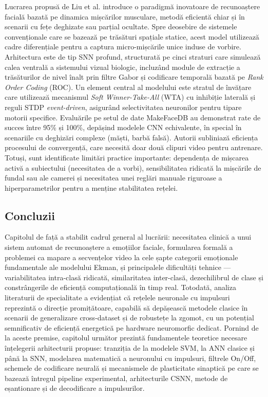 Lucrarea propusă de Liu et al. \cite{liu2020} introduce o paradigmă inovatoare de re\-cu\-noaș\-te\-re facială bazată pe dinamica mișcărilor musculare, metodă eficientă chiar și în scenarii cu fețe deghizate sau parțial ocultate. Spre deosebire de sistemele convenționale care se bazează pe trăsături spațiale statice, acest model utilizează cadre diferențiale pentru a captura micro-mișcările unice induse de vorbire. Arhitectura este de tip SNN profund, structurată pe cinci straturi care simulează calea ventrală a sistemului vizual biologic, incluzând module de extracție a trăsăturilor de nivel înalt prin filtre Gabor și codificare temporală bazată pe \textit{Rank Order Coding} (ROC). Un element central al modelului este stratul de învățare care utilizează mecanismul \textit{Soft Winner-Take-All} (WTA) cu inhibiție laterală și reguli STDP \textit{event-driven}, asigurând selectivitatea neuronilor pentru tipare motorii specifice. Evaluările pe setul de date MakeFaceDB au demonstrat rate de succes între 95\% și 100\%, depășind modelele CNN echivalente, în special în scenariile cu deghizări complexe (măști, barbă falsă). Autorii subliniază eficiența procesului de convergență, care necesită doar două clipuri video pentru antrenare. Totuși, sunt identificate limitări practice importante: dependența de mișcarea activă a subiectului (necesitatea de a vorbi), sensibilitatea ridicată la mișcările de fundal sau ale camerei și necesitatea unei reglări manuale riguroase a hiperparametrilor pentru a menține stabilitatea rețelei.

\subsection*{Concluzii}
Capitolul de față a stabilit cadrul general al lucrării: necesitatea clinică a unui sistem automat de recunoaștere a emoțiilor faciale, formularea formală a problemei ca mapare a secvențelor video la cele șapte categorii emoționale fundamentale ale modelului Ekman, și principalele dificultăți tehnice --- variabilitatea intra-clasă ridicată, similaritatea inter-clasă, dezechilibrul de clase și constrângerile de eficiență computațională în timp real. Totodată, analiza literaturii de specialitate a evidențiat că rețelele neuronale cu impulsuri reprezintă o direcție promițătoare, capabilă să depășească metodele clasice în scenarii de generalizare cross-dataset și de robustețe la zgomot, cu un potențial semnificativ de eficiență energetică pe hardware neuromorfic dedicat. Pornind de la aceste premise, capitolul următor prezintă fundamentele teoretice necesare înțelegerii arhitecturii propuse: tranziția de la modelele SVM, la ANN clasice și până la SNN, modelarea matematică a neuronului cu impulsuri, filtrele On/Off, schemele de codificare neurală și mecanismele de plasticitate sinaptică pe care se bazează întregul pipeline experimental, arhitecturile CSNN, metode de eșantionare și de decodificare a impulsurilor.